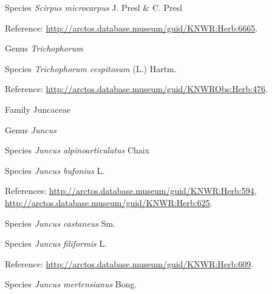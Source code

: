 \documentclass[9pt, article]{memoir}
\begin{document}
\begin{multicols}{2}
\vspace{6pt}\noindent\hspace{36pt}Species \textit{Scirpus microcarpus} J. Presl \& C. Presl


\vspace{6pt}Reference: 
\url{http://arctos.database.museum/guid/KNWR:Herb:6665}.

\vspace{6pt}\noindent\hspace{30pt}Genus \textit{Trichophorum}


\vspace{6pt}\noindent\hspace{36pt}Species \textit{Trichophorum cespitosum} (L.) Hartm.


\vspace{6pt}Reference: 
\url{http://arctos.database.museum/guid/KNWRObs:Herb:476}.

\vspace{6pt}\noindent\hspace{24pt}Family Juncaceae


\vspace{6pt}\noindent\hspace{30pt}Genus \textit{Juncus}


\vspace{6pt}\noindent\hspace{36pt}Species \textit{Juncus alpinoarticulatus} Chaix


\vspace{6pt}\noindent\hspace{36pt}Species \textit{Juncus bufonius} L.


\vspace{6pt}References: 
\url{http://arctos.database.museum/guid/KNWR:Herb:594}, 
\url{http://arctos.database.museum/guid/KNWR:Herb:625}.

\vspace{6pt}\noindent\hspace{36pt}Species \textit{Juncus castaneus} Sm.


\vspace{6pt}\noindent\hspace{36pt}Species \textit{Juncus filiformis} L.


\vspace{6pt}Reference: 
\url{http://arctos.database.museum/guid/KNWR:Herb:609}.

\vspace{6pt}\noindent\hspace{36pt}Species \textit{Juncus mertensianus} Bong.



\end{multicols}
\end{document}
